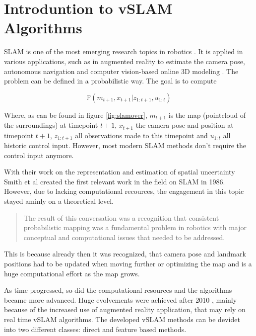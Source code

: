 \chapter{Introduntion to vSLAM Algorithms}

SLAM is one of the most emerging research topics in robotics \cite{slamintro}. It is applied in various applications, such as in augmented reality to estimate the camera pose,
autonomous navigation and computer vision-based online 3D modeling \cite{evolved} \cite{dso}.
The problem can be defined in a probabilistic way. The goal is to compute 

$$\mathbb{P}\left(m_{t+1},x_{t+1}|z_{1:t+1},u_{1:t}\right)$$

Where, as can be found in figure \ref{fig:slamover}, $m_{t+1}$ is the map (pointcloud of the surroundings) at timepoint $t+1$, $x_{t+1}$ the 
camera pose and position at timepoint $t+1$, $z_{1:t+1}$ all observations made to this timepoint and $u_{1:t}$ all historic control input. However, most
modern SLAM methods don't require the control input anymore. 


With their work on the representation and estimation of spatial uncertainty \cite{hist1}
Smith et al created the first relevant work in the field on SLAM in 1986. However, due to lacking computational recources, the engagement in this topic stayed aminly
on a theoretical level. 


  \begin{quote}
   The result of this conversation was a recognition that
	consistent probabilistic mapping was a fundamental problem
	in robotics with major conceptual and computational issues
	that needed to be addressed. \cite{hist2}
  \end{quote}
  
This is because already then it was recognized, that camera pose and landmark positions had to be updated when moving further or optimizing the map and is a huge computational 
effort as the map grows. 

As time progressed, so did the computational resources and the algorithms became more advanced. Huge evolvements were achieved after 2010 \cite{evolved}, mainly because of the increased
use of augmented reality application, that may rely on real time vSLAM algorithms. The developed vSLAM methods can be devidet into two different classes: direct and feature based methods.

